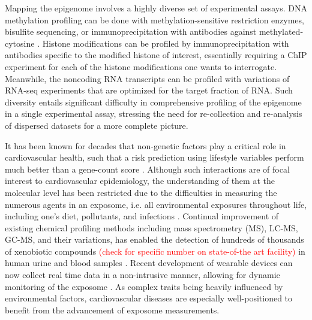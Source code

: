 \documentclass[letter]{bioinfo}
\newcommand{\comment}[1]{\textcolor{red}{#1}}
\begin{document}
	
	
	
	Mapping the epigenome involves a highly diverse set of experimental assays. DNA methylation profiling can be done with methylation-sensitive restriction enzymes, bisulfite sequencing, or immunoprecipitation with antibodies against methylated-cytosine \citep{Bibikova:2010:Genomewide}. Histone modifications can be profiled by immunoprecipitation with antibodies specific to the modified histone of interest, essentially requiring a ChIP experiment for each of the histone modifications one wants to interrogate. Meanwhile, the noncoding RNA transcripts can be profiled with variations of RNA-seq experiments that are optimized for the target fraction of RNA. Such diversity entails significant difficulty in comprehensive profiling of the epigenome in a single experimental assay, stressing the need for re-collection and re-analysis of dispersed datasets for a more complete picture.
	


	
	
	It has been known for decades that non-genetic factors play a critical role in cardiovascular health, such that a risk prediction using lifestyle variables perform much better than a gene-count score \citep{Joyner:2011:Ten}. Although such interactions are of focal interest to cardiovascular epidemiology,  the understanding of them at the molecular level has been restricted due to the difficulties in measuring the numerous agents in an exposome, i.e. all environmental exposures throughout life, including one's diet, pollutants, and infections \citep{Wild:2005:Complementing}. Continual improvement of existing chemical profiling methods including mass spectrometry (MS), LC-MS, GC-MS, and their variations, has enabled the detection of hundreds of thousands of xenobiotic compounds \comment{(check for specific number on state-of-the art facility)} in human urine and blood samples \citep{Warth:2017:ExposomeScale}.
	Recent development of wearable devices can now collect real time data in a non-intrusive manner, allowing for dynamic monitoring of the exposome \citep{Jiang:2018:Dynamic}. As complex traits being heavily influenced by environmental factors, cardiovascular diseases are especially well-positioned to benefit from the advancement of exposome measurements.
	
\end{document}

